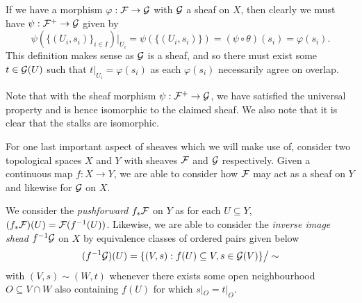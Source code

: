 \documentclass[12pt]{article}
\begin{document}
If we have a morphism $\varphi : \mathcal{F} \to \mathcal{G}$ with $\mathcal{G}$ a sheaf on $X$,
then clearly we must have $\psi : \mathcal{F}^+ \to \mathcal{G}$ given by
\[
    \psi(\{(U_i, s_i)\}_{i \in I})|_{U_i} = \psi(\{(U_i, s_i)\}) = (\psi \circ \theta)(s_i) = \varphi(s_i).
\]
This definition makes sense as $\mathcal{G}$ is a sheaf,
and so there must exist some $t \in \mathcal{G}(U)$ such that $t|_{U_i} = \varphi(s_i)$ as each $\varphi(s_i)$ necessarily agree on overlap.

Note that with the sheaf morphism $\psi : \mathcal{F}^+ \to \mathcal{G}$, we have satisfied the universal property and is hence isomorphic to the claimed sheaf.
We also note that it is clear that the stalks are isomorphic.

For one last important aspect of sheaves which we will make use of,
consider two topological spaces $X$ and $Y$ with sheaves $\mathcal{F}$ and $\mathcal{G}$ respectively.
Given a continuous map $f : X \to Y$, 
we are able to consider how $\mathcal{F}$ may act as a sheaf on $Y$ and likewise for $\mathcal{G}$ on $X$.

We consider the \textit{pushforward} $f_*\mathcal{F}$ on $Y$ as for each $U \subseteq Y$, $(f_*\mathcal{F})(U) = \mathcal{F}(f^{-1}(U))$.
Likewise, we are able to consider the \textit{inverse image shead} $f^{-1}\mathcal{G}$ on $X$ by equivalence classes of ordered pairs given below
\[
    (f^{-1}\mathcal{G})(U) = \{ (V, s) : f(U) \subseteq V, s \in \mathcal{G}(V) \}
     \big / \sim
\]
with $(V, s) \sim (W, t)$ whenever there exists some open neighbourhood $O \subseteq V \cap W$ also containing $f(U)$ for which $s|_O = t|_O$.
\end{document}
